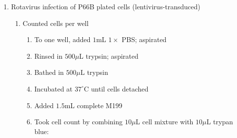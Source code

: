 \begin{enumerate}
	\item Rotavirus infection of P66B plated cells (lentivirus-transduced)
		\begin{enumerate}
			\item Counted cells per well
				\begin{enumerate}
					\item To one well, added $1$mL $1\times$ PBS; aspirated
					\item Rinsed in $500\mu$L trypsin; aspirated
					\item Bathed in $500\mu$L trypsin
					\item Incubated at $37^{\circ}$C until cells detached
					\item Added $1.5$mL complete M199
					\item Took cell count by combining $10\mu$L cell mixture with $10\mu$L trypan blue:
			

\end{enumerate}
\end{enumerate}
\end{enumerate}
